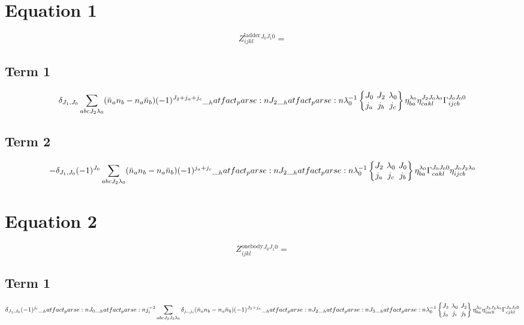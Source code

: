 \documentclass{scrartcl}
\newcommand{\sixj}[6]{\begingroup\setlength{\arraycolsep}{0.2em}\begin{Bmatrix} #1 & #2 & #3 \\ #4 & #5 & #6 \end{Bmatrix}\endgroup}
\begin{document}
\section{Equation 1}
\begin{dmath*}
Z^{\mathrm{ladder}}_{i j k l}^{{J}_{0} {J}_{1} 0} = 
\end{dmath*}
\subsection{Term 1}
\begin{dmath*}
\delta_{{J}_{1},{J}_{0}} \* \sum_{a b c {J}_{2} {{\lambda}}_{0}} \* (\bar{n}_{a} \* n_{b} -n_{a} \* \bar{n}_{b}) \* (-1)^{{J}_{2}+{j}_{a}+{j}_{c}} \* \hatfact{{J}_{2}} \* \hatfact{{{\lambda}}_{0}^{-1}} \* \sixj{{J}_{0}}{{J}_{2}}{{{\lambda}}_{0}}{{j}_{a}}{{j}_{b}}{{j}_{c}} \* \eta_{b a}^{{{\lambda}}_{0}} \* \eta_{c a k l}^{{J}_{2} {J}_{0} {{\lambda}}_{0}} \* \Gamma_{i j c b}^{{J}_{0} {J}_{0} 0}
\end{dmath*}
\subsection{Term 2}
\begin{dmath*}
-\delta_{{J}_{1},{J}_{0}} \* (-1)^{{J}_{0}} \* \sum_{a b c {J}_{2} {{\lambda}}_{0}} \* (\bar{n}_{a} \* n_{b} -n_{a} \* \bar{n}_{b}) \* (-1)^{{j}_{a}+{j}_{c}} \* \hatfact{{J}_{2}} \* \hatfact{{{\lambda}}_{0}^{-1}} \* \sixj{{J}_{2}}{{{\lambda}}_{0}}{{J}_{0}}{{j}_{a}}{{j}_{c}}{{j}_{b}} \* \eta_{b a}^{{{\lambda}}_{0}} \* \Gamma_{c a k l}^{{J}_{0} {J}_{0} 0} \* \eta_{i j c b}^{{J}_{0} {J}_{2} {{\lambda}}_{0}}
\end{dmath*}

\section{Equation 2}
\begin{dmath*}
Z^{\mathrm{onebody}}_{i j k l}^{{J}_{0} {J}_{1} 0} = 
\end{dmath*}
\subsection{Term 1}
\begin{dmath*}
\delta_{{J}_{1},{J}_{0}} \* (-1)^{{j}_{i}} \* \hatfact{{J}_{0}} \* \hatfact{{j}_{i}^{-2}} \* \sum_{a b c {J}_{2} {J}_{3} {{\lambda}}_{0}} \* \delta_{{j}_{c},{j}_{i}} \* (\bar{n}_{a} \* n_{b} -n_{a} \* \bar{n}_{b}) \* (-1)^{{J}_{2}+{j}_{a}} \* \hatfact{{J}_{2}} \* \hatfact{{J}_{3}} \* \hatfact{{{\lambda}}_{0}^{-1}} \* \sixj{{J}_{3}}{{{\lambda}}_{0}}{{J}_{2}}{{j}_{a}}{{j}_{i}}{{j}_{b}} \* \eta_{b a}^{{{\lambda}}_{0}} \* \eta_{i a c b}^{{J}_{2} {J}_{3} {{\lambda}}_{0}} \* \Gamma_{c j k l}^{{J}_{0} {J}_{0} 0}
\end{dmath*}
\end{document}
